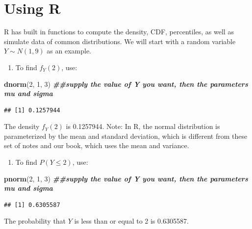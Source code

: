 \documentclass[
]{book}
\newenvironment{Shaded}{\begin{snugshade}}{\end{snugshade}}
\newcommand{\DecValTok}[1]{\textcolor[rgb]{0.00,0.00,0.81}{#1}}
\newcommand{\DocumentationTok}[1]{\textcolor[rgb]{0.56,0.35,0.01}{\textbf{\textit{#1}}}}
\newcommand{\FunctionTok}[1]{\textcolor[rgb]{0.13,0.29,0.53}{\textbf{#1}}}
\newcommand{\NormalTok}[1]{#1}
\providecommand{\tightlist}{%
  \setlength{\itemsep}{0pt}\setlength{\parskip}{0pt}}
\begin{document}
\hypertarget{RCont}{%
\section{Using R}\label{RCont}}

R has built in functions to compute the density, CDF, percentiles, as well as simulate data of common distributions. We will start with a random variable \(Y \sim N(1, 9)\) as an example.

\begin{enumerate}
\def\labelenumi{\arabic{enumi}.}
\tightlist
\item
  To find \(f_Y(2)\), use:
\end{enumerate}

\begin{Shaded}
\begin{Highlighting}[]
\FunctionTok{dnorm}\NormalTok{(}\DecValTok{2}\NormalTok{, }\DecValTok{1}\NormalTok{, }\DecValTok{3}\NormalTok{) }\DocumentationTok{\#\#supply the value of Y you want, then the parameters mu and sigma}
\end{Highlighting}
\end{Shaded}

\begin{verbatim}
## [1] 0.1257944
\end{verbatim}

The density \(f_Y(2)\) is 0.1257944. Note: In R, the normal distribution is parameterized by the mean and standard deviation, which is different from these set of notes and our book, which uses the mean and variance.

\begin{enumerate}
\def\labelenumi{\arabic{enumi}.}
\setcounter{enumi}{1}
\tightlist
\item
  To find \(P(Y \leq 2)\), use:
\end{enumerate}

\begin{Shaded}
\begin{Highlighting}[]
\FunctionTok{pnorm}\NormalTok{(}\DecValTok{2}\NormalTok{, }\DecValTok{1}\NormalTok{, }\DecValTok{3}\NormalTok{) }\DocumentationTok{\#\#supply the value of Y you want, then the parameters mu and sigma}
\end{Highlighting}
\end{Shaded}

\begin{verbatim}
## [1] 0.6305587
\end{verbatim}

The probability that \(Y\) is less than or equal to 2 is 0.6305587.
\end{document}
